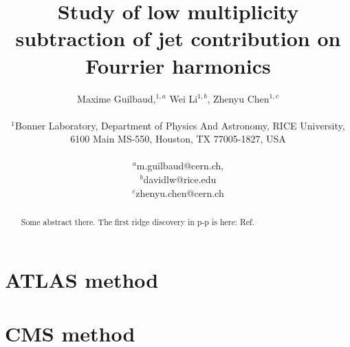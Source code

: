 \documentclass[12pt]{article}
\title{Study of low multiplicity subtraction of jet contribution on Fourrier harmonics}
\author
{Maxime Guilbaud,$^{1,a}$ Wei Li$^{1,b}$, Zhenyu Chen$^{1,c}$\\
\\
\normalsize{$^{1}$Bonner Laboratory, Department of Physics And Astronomy, RICE University,}\\
\normalsize{6100 Main MS-550, Houston, TX 77005-1827, USA}\\
\\
\normalsize{$^{a}$m.guilbaud@cern.ch, }\\
\normalsize{$^{b}$davidlw@rice.edu}\\
\normalsize{$^{c}$zhenyu.chen@cern.ch}\\
}
\date{}
\begin{document}
 


\baselineskip24pt


\maketitle 


\begin{abstract}

Some abstract there. The first ridge discovery in p-p is here: Ref.~\cite{Khachatryan:2010gv}

\end{abstract}


\section{ATLAS method}
\section{CMS method}





\clearpage
\end{document}
